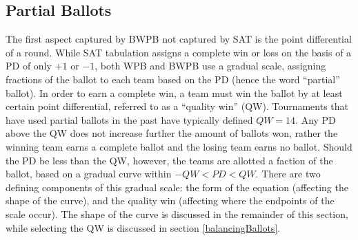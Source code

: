 \documentclass{article}
\begin{document}
\subsection{Partial Ballots}
The first aspect captured by BWPB not captured by SAT is the point differential of a round.  While SAT tabulation assigns a complete win or loss on the basis of a PD of only $+1$ or $-1$, both WPB and BWPB use a gradual scale, assigning fractions of the ballot to each team based on the PD (hence the word ``partial'' ballot).  In order to earn a complete win, a team must win the ballot by at least certain point differential, referred to as a ``quality win'' (QW).  Tournaments that have used partial ballots in the past have typically defined $QW=14$.  Any PD above the QW does not increase further the amount of ballots won, rather the winning team earns a complete ballot and the losing team earns no ballot.  Should the PD be less than the QW, however, the teams are allotted a faction of the ballot, based on a gradual curve within $-QW<PD<QW$.  There are two defining components of this gradual scale:  the form of the equation (affecting the shape of the curve), and the quality win (affecting where the endpoints of the scale occur).  The shape of the curve is discussed in the remainder of this section, while selecting the QW is discussed in section \ref{balancingBallots}.
\end{document}
